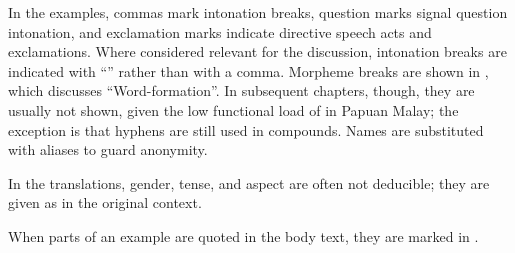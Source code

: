 In the examples, commas mark intonation breaks, question marks signal question intonation, and exclamation marks indicate directive speech acts and exclamations. Where considered relevant for the discussion, intonation breaks are indicated with ``{\textbar}” rather than with a comma. Morpheme breaks are shown in , which discusses ``Word-formation”. In subsequent chapters, though, they are usually not shown, given the low functional load of  in Papuan Malay; the exception is that hyphens are still used in compounds. Names are substituted with aliases to guard anonymity.

In the translations, gender, tense, and aspect are often not deducible; they are given as in the original context.

When parts of an example are quoted in the body text, they are marked in .
